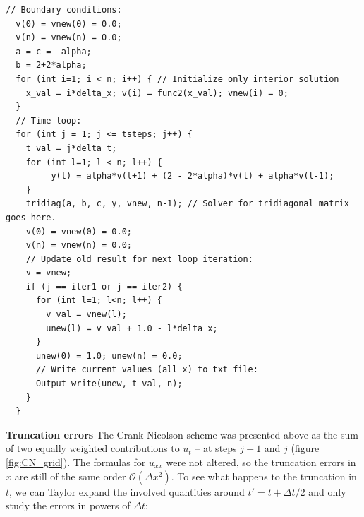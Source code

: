 \documentclass[a4paper, 11pt, notitlepage,english]{article}
\begin{document}
\begin{center}
\begin{lstlisting}
// Boundary conditions:
  v(0) = vnew(0) = 0.0;
  v(n) = vnew(n) = 0.0;
  a = c = -alpha; 
  b = 2+2*alpha; 
  for (int i=1; i < n; i++) { // Initialize only interior solution
    x_val = i*delta_x; v(i) = func2(x_val); vnew(i) = 0;
  }
  // Time loop: 
  for (int j = 1; j <= tsteps; j++) {
    t_val = j*delta_t;
    for (int l=1; l < n; l++) {
         y(l) = alpha*v(l+1) + (2 - 2*alpha)*v(l) + alpha*v(l-1);
    }
    tridiag(a, b, c, y, vnew, n-1); // Solver for tridiagonal matrix goes here.
    v(0) = vnew(0) = 0.0;
    v(n) = vnew(n) = 0.0;
    // Update old result for next loop iteration:
    v = vnew;
    if (j == iter1 or j == iter2) {
      for (int l=1; l<n; l++) {
        v_val = vnew(l);
        unew(l) = v_val + 1.0 - l*delta_x;
      }
      unew(0) = 1.0; unew(n) = 0.0;
      // Write current values (all x) to txt file:
      Output_write(unew, t_val, n);
    }
  }
\end{lstlisting}
\end{center}

\textbf{Truncation errors} \newline
The Crank-Nicolson scheme was presented above as the sum of two equally weighted contributions to $u_t$ – at steps $j+1$ and $j$ (figure \ref{fig:CN_grid}). 
The formulas for $u_{xx}$ were not altered, so the truncation errors in $x$ are still of the same order $\mathcal{O}(\Delta x^2)$. To see what happens to the truncation 
in $t$, we can Taylor expand the involved quantities around $t' = t + \Delta t /2$ and only study the errors in powers of $\Delta t$:
\end{document}
